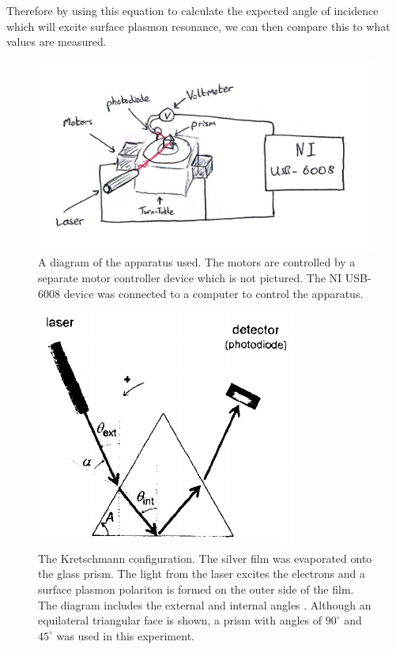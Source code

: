 \documentclass[%
reprint,
amsmath,amssymb,
aps,
]{revtex4-2}
\begin{document}
			Therefore by using this equation to calculate the expected angle of incidence which will excite surface plasmon resonance, we can then compare this to what values are measured.
		
			\begin{figure}
				\includegraphics[width=0.85\columnwidth]{SPdiagram.jpg}
				\caption{\label{fig:apparatus}A diagram of the apparatus used. The motors are controlled by a separate motor controller device which is not pictured. The NI USB-6008 device was connected to a computer to control the apparatus.}
			\end{figure}
			\begin{figure}
				\includegraphics[width=0.7\columnwidth]{anglesDiagram.png}
				\caption{\label{fig:angles}The Kretschmann configuration. The silver film was evaporated onto the glass prism. The light from the laser excites the electrons and a surface plasmon polariton is formed on the outer side of the film. The diagram includes the external and internal angles \cite{pluchery}. Although an equilateral triangular face is shown, a prism with angles of $90^\circ$ and $45^\circ$ was used in this experiment.}
			\end{figure}
	 
\end{document}
